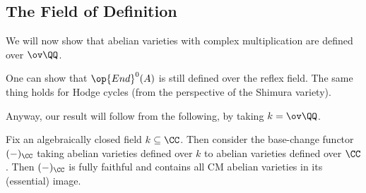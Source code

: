 \documentclass[../notes.tex]{subfiles}
\begin{document}
\subsection{The Field of Definition}
We will now show that abelian varieties with complex multiplication are defined over $\ov\QQ$.
\begin{remark}
	One can show that $\op{End}^0(A)$ is still defined over the reflex field. The same thing holds for Hodge cycles (from the perspective of the Shimura variety).
\end{remark}
Anyway, our result will follow from the following, by taking $k=\ov\QQ$.
\begin{proposition} \label{prop:base-change-av}
	Fix an algebraically closed field $k\subseteq\CC$. Then consider the base-change functor $(-)_\CC$ taking abelian varieties defined over $k$ to abelian varieties defined over $\CC$. Then $(-)_\CC$ is fully faithful and contains all CM abelian varieties in its (essential) image.
\end{proposition}
\end{document}
